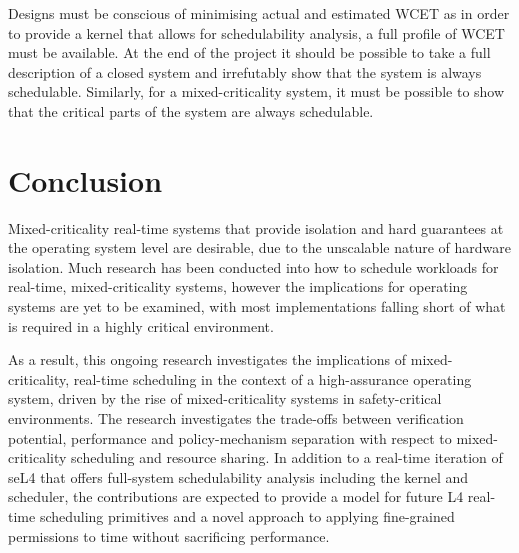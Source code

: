 Designs must be conscious of minimising actual and estimated \gls{WCET} as in order to provide a kernel that allows for schedulability analysis, a full profile of \gls{WCET} must be available.
At the end of the project it should be possible to take a full description of a closed system and irrefutably show that the system is always schedulable.
Similarly, for a mixed-criticality system, it must be possible to show that the critical parts of the system are always schedulable.

\section{Conclusion}

Mixed-criticality real-time systems that provide isolation and hard guarantees at the operating
system level are desirable, due to the unscalable nature of hardware isolation.  Much research has
been conducted into how to schedule workloads for real-time, mixed-criticality systems, however the
implications for operating systems are yet to be examined, with most implementations falling short
of what is required in a highly critical environment.

As a result, this ongoing research investigates the implications of mixed-criticality, real-time
scheduling in the context of a high-assurance operating system, driven by the rise of
mixed-criticality systems in safety-critical environments.  The research investigates the trade-offs
between verification potential, performance and policy-mechanism separation with respect to
mixed-criticality scheduling and resource sharing.  In addition to a real-time iteration of seL4
that offers full-system schedulability analysis including the kernel and scheduler, the
contributions are expected to provide a model for future L4 real-time scheduling primitives and a
novel approach to applying fine-grained permissions to time without sacrificing performance.


